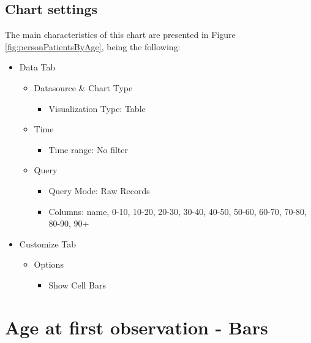 \documentclass[
]{book}
\providecommand{\tightlist}{%
  \setlength{\itemsep}{0pt}\setlength{\parskip}{0pt}}
\begin{document}
\hypertarget{chart-settings-8}{%
\subsection{Chart settings}\label{chart-settings-8}}

The main characteristics of this chart are presented in Figure \ref{fig:personPatientsByAge}, being the following:

\begin{itemize}
\item
  Data Tab

  \begin{itemize}
  \item
    Datasource \& Chart Type

    \begin{itemize}
    \tightlist
    \item
      Visualization Type: Table
    \end{itemize}
  \item
    Time

    \begin{itemize}
    \tightlist
    \item
      Time range: No filter
    \end{itemize}
  \item
    Query

    \begin{itemize}
    \item
      Query Mode: Raw Records
    \item
      Columns: name, 0-10, 10-20, 20-30, 30-40, 40-50, 50-60, 60-70, 70-80, 80-90, 90+
    \end{itemize}
  \end{itemize}
\item
  Customize Tab

  \begin{itemize}
  \item
    Options

    \begin{itemize}
    \tightlist
    \item
      Show Cell Bars
    \end{itemize}
  \end{itemize}
\end{itemize}

\hypertarget{age-at-first-observation---bars}{%
\section{Age at first observation - Bars}\label{age-at-first-observation---bars}}
\end{document}
